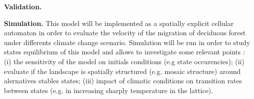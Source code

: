 

\textbf{Validation.} 


\textbf{Simulation.} This model will be implemented as a spatially explicit
cellular automaton in order to evaluate the velocity of the
migration of deciduous forest under differents climate change scenario.
Simulation will be run in order to study states equilibrium of this model and
allows to investigate some relevant points : (i) the sensitivity of
the model on initials conditions (e.g state occurencies); (ii) evaluate if the
landscape is spatially structured (e.g. mosaic structure) around alernatives
stables states; (iii) impact of climatic conditions on transition rates
between states (e.g. in increasing sharply temperature in the lattice). \\



\clearpage





